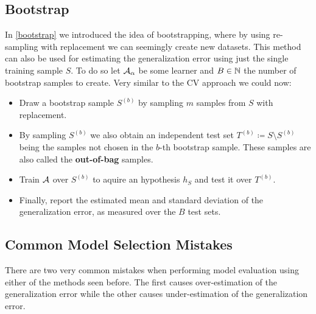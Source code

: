 \subsection{Bootstrap}
In \autoref{bootstrap} we introduced the idea of bootstrapping, where by using re-sampling with replacement we can seemingly create new datasets. This method can also be used for estimating the generalization error using just the single training sample $S$. To do so let $\mathcal{A}_\alpha$ be some learner and $B\in\mathbb{N}$ the number of bootstrap samples to create. Very similar to the CV approach we could now:
\begin{itemize}
	\item Draw a bootstrap sample $S^{\left(b\right)}$ by sampling $m$ samples from $S$ with replacement.
	\item By sampling $S^{\left(b\right)}$ we also obtain an independent test set $T^{\left(b\right)}\coloneqq S\setminus S^{\left(b\right)}$ being the samples not chosen in the $b$-th bootstrap sample. These samples are also called the \textbf{out-of-bag} samples.
	\item Train $\mathcal{A}$ over $S^{\left(b\right)}$ to aquire an hypothesis $h_S$ and test it over $T^{\left(b\right)}$.
	\item Finally, report the estimated mean and standard deviation of the generalization error, as measured over the $B$ test sets.
\end{itemize} 
\subsection{Common Model Selection Mistakes}
There are two very common mistakes when performing model evaluation using either of the methods seen before. The first causes over-estimation of the generalization error while the other causes under-estimation of the generalization error.
